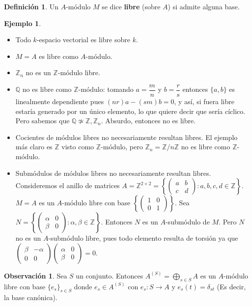 \documentclass[12pt]{book}
\theoremstyle{definition}
\newtheorem{obs}[teo]{Observación}
\newtheorem{defn}[teo]{Definición}
\newtheorem{ex}[teo]{Ejemplo}
\newcommand{\ZZ}{\mathbb{Z}}      %
\newcommand{\QQ}{\mathbb{Q}}
\begin{document}
\begin{defn}
Un $A$-módulo $M$ se dice \textbf{libre} (sobre $A$) si admite alguna base.
\end{defn}

\begin{ex}
\begin{itemize}
\item Todo $k$-espacio vectorial es libre sobre $k$.
\item $M=A$ es libre como $A$-módulo.
\item $\ZZ_n$ no es un $\ZZ$-módulo libre.
\item $\QQ$ no es libre como $\ZZ$-módulo: tomando $a=\dfrac{m}{n}$ y $b=\dfrac{r}{s}$ entonces $\{a,b\}$ es linealmente dependiente pues $(nr)a - (sm)b = 0$, y así, si fuera libre estaría generado por un único elemento, lo que quiere decir que sería cíclico. Pero sabemos que $\QQ\not\simeq \ZZ, \ZZ_n$. Absurdo, entonces no es libre.
\item Cocientes de módulos libres no necesariamente resultan libres. El ejemplo más claro es $\ZZ$ visto como $\ZZ$-módulo, pero $\ZZ_n = \ZZ/n\ZZ$ no es libre como $\ZZ$-módulo.
\item Submódulos de módulos libres no necesariamente resultan libres. Consideremos el anillo de matrices $A=\ZZ^{2\times 2} = \left\{  \begin{pmatrix}a & b \\ c & d\end{pmatrix}: a,b,c,d\in \ZZ\right\}$. $M=A$ es un $A$-módulo libre con base $\left\{\begin{pmatrix}1&0\\0&1\end{pmatrix}\right\}$. Sea $N = \left\{ \begin{pmatrix}\alpha & 0 \\ \beta & 0 \end{pmatrix} : \alpha,\beta\in\ZZ\right\}$. Entonces $N$ es un $A$-submódulo de $M$. Pero $N$ no es un $A$-submódulo libre, pues todo elemento resulta de torsión ya que $\begin{pmatrix}\beta & -\alpha \\ 0 & 0\end{pmatrix}\begin{pmatrix}\alpha & 0 \\ \beta & 0 \end{pmatrix} = 0$.
\end{itemize}
\end{ex}

\begin{obs}
Sea $S$ un conjunto. Entonces $A^{(S)} = \displaystyle\bigoplus_{s\in S} A$ es un $A$-módulo libre con base $\{e_s\}_{s\in S}$ donde $e_s\in A^{(S)}$ con $e_s:S\to A$ y $e_s(t) = \delta_{st}$ (Es decir, la base canónica).
\end{obs}
\end{document}
